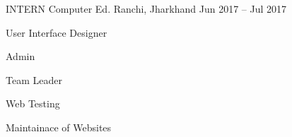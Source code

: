 

\begin{cventries}

  \cventry
    {INTERN} %
    {Computer Ed.} %
    {Ranchi, Jharkhand} %
    {Jun 2017 – Jul 2017} %
    {
      \begin{cvitems} %
        \item {User Interface Designer}
        \item {Admin}
        \item {Team Leader}
        \item {Web Testing}
        \item {Maintainace of Websites}
      \end{cvitems}
    }

  

\end{cventries}
